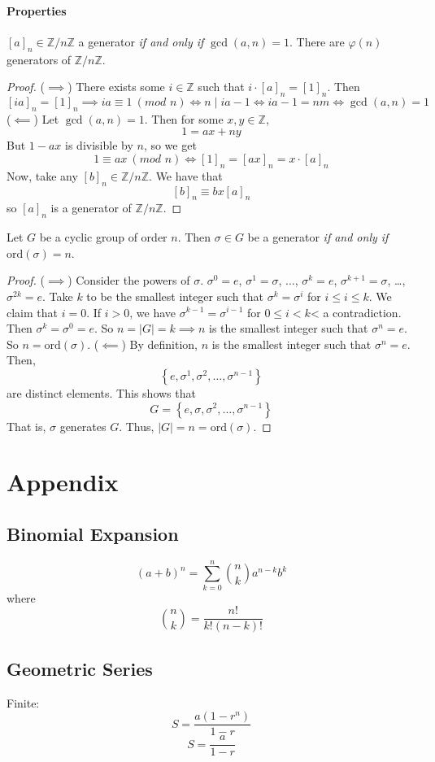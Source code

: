 \documentclass{report}
\newcommand{\Z}{\mathbb{Z}}
\newcommand{\modclass}[1]{\Z/{#1}\Z}
\newcommand{\ord}{\text{ord}}
\newcommand{\proposition}[1]{\begin{tcolorbox}[title=\textit{Proposition}]{#1}\end{tcolorbox}}
\renewcommand{\mod}[1]{\ (\textit{mod } {#1})}
\begin{document}
\subsubsection{Properties}
\proposition {
    $[a]_n \in \modclass{n}$ a generator \textit{if and only if} $\gcd(a, n) = 1$. There are $\varphi(n)$ generators
    of $\modclass{n}$.
}
\begin{proof}
    ($\implies$) There exists some $i \in \Z$ such that $i \cdot [a]_n = [1]_n$. Then
    \[[ia]_n = [1]_n \implies ia \equiv 1 \mod{n} \iff n \mid ia - 1 \iff ia - 1 = nm \iff \gcd(a, n) = 1\]
    ($\impliedby$)
    Let $\gcd(a, n) = 1$. Then for some $x, y \in \Z$,
    \[1 = ax + ny\]
    But $1 - ax$ is divisible by $n$, so we get
    \[1 \equiv ax \mod{n} \iff [1]_n = [ax]_n = x \cdot [a]_n\]
    Now, take any $[b]_n \in \modclass{n}$. We have that 
    \[[b]_n \equiv bx [a]_n\]
    so $[a]_n$ is a generator of $\modclass{n}$.
\end{proof}

\proposition {
    Let $G$ be a cyclic group of order $n$. Then $\sigma \in G$ be a generator \textit{if and only if}
    $\ord(\sigma) = n$.
}
\begin{proof}
    ($\implies$)
    Consider the powers of $\sigma$. $\sigma^0 = e$, $\sigma^1 = \sigma$, $\ldots$, $\sigma^k = e$,
    $\sigma^{k + 1} = \sigma$, \ldots, $\sigma^{2k} = e$. Take $k$ to be the smallest integer such that
    $\sigma^k = \sigma^i$ for $i \leq i \leq k$. We claim that $i = 0$. 
    \newline
    \newline
    If $i > 0$, we have $\sigma^{k - 1} = \sigma^{i - 1}$ for $0 \leq i < k$< a contradiction. Then
    $\sigma^k = \sigma^0 = e$. So $n = |G| = k \implies n$ is the smallest integer such that
    $\sigma^n = e$. So $n = \ord(\sigma)$.
    \newline
    \newline
    ($\impliedby$) By definition, $n$ is the smallest integer such that $\sigma^n = e$. Then,
    \[\left\{ e, \sigma^1, \sigma^2, \ldots, \sigma^{n - 1} \right\}\]
    are distinct elements. This shows that 
    \[G = \left\{ e, \sigma, \sigma^2, \ldots, \sigma^{n - 1} \right\}\]
    That is, $\sigma$ generates $G$. Thus, $|G| = n = \ord(\sigma)$.
\end{proof}


\newpage
\chapter{Appendix}
\section*{Binomial Expansion}
\[(a + b)^n = \sum_{k=0}^{n} \binom{n}{k} a^{n-k} b^k\]
where
\[\binom{n}{k} = \frac{n!}{k!(n-k)!}\]


\section*{Geometric Series}
Finite:
\[S = \frac{a(1-r^n)}{1-r}\]
\[S = \frac{a}{1-r}\]
\end{document}
